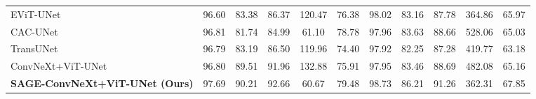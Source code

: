 \begin{table}[t]
{\begin{tabular}{l|ccccc|ccccc}
EViT-UNet \cite{li2025evit}
& 96.60 & 83.38 & 86.37 & 120.47 & 76.38
& 98.02 & 83.16 & 87.78 & \cellcolor{SecondBestColor}\textcolor{SecondBestTextColor}{364.86} & 65.97 \\

CAC-UNet \cite{zhu2021multi}
& 96.81 & 81.74 & 84.99 & \cellcolor{SecondBestColor}\textcolor{SecondBestTextColor}{61.10} & \cellcolor{SecondBestColor}\textcolor{SecondBestTextColor}{78.78}
& 97.96 & 83.63 & 88.66 & 528.06 & 65.03 \\

TransUNet \cite{chen2021transunet}
& 96.79 & 83.19 & 86.50 & 119.96 & 74.40
& 97.92 & 82.25 & 87.28 & 419.77 & 63.18 \\

\midrule

ConvNeXt+ViT-UNet
& 96.80 & \cellcolor{SecondBestColor}\textcolor{SecondBestTextColor}{89.51} & \cellcolor{SecondBestColor}\textcolor{SecondBestTextColor}{91.96} & 132.88 & 75.91
& 97.95 & 83.46 & 88.69 & 482.08 & 65.16 \\

\textbf{SAGE-ConvNeXt+ViT-UNet (Ours)}
& \cellcolor{BestColor}\textcolor{BestTextColor}{97.69} & \cellcolor{BestColor}\textcolor{BestTextColor}{90.21} & \cellcolor{BestColor}\textcolor{BestTextColor}{92.66} & \cellcolor{BestColor}\textcolor{BestTextColor}{60.67} & \cellcolor{BestColor}\textcolor{BestTextColor}{79.48}
& \cellcolor{BestColor}\textcolor{BestTextColor}{98.73} & \cellcolor{BestColor}\textcolor{BestTextColor}{86.21} & \cellcolor{BestColor}\textcolor{BestTextColor}{91.26} & \cellcolor{BestColor}\textcolor{BestTextColor}{362.31} & \cellcolor{BestColor}\textcolor{BestTextColor}{67.85} \\
\bottomrule
\end{tabular}
}%
\setlength{\tabcolsep}{6pt}
\setlength{\arrayrulewidth}{0.4pt}
\end{table}


